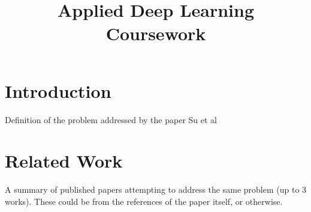\documentclass[conference]{IEEEtran}
\begin{document}
\title{Applied Deep Learning Coursework}

\author{
\and
{}
\and
{}

}

\maketitle


\section{Introduction}
Definition of the problem addressed by the paper Su et al

\section{Related Work}
A summary of published papers attempting to address the same problem (up to 3 works). These could be from the references of the paper itself, or otherwise. 

\end{document}

